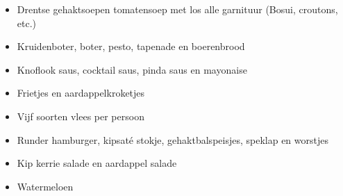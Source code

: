 \begin{itemize}
\item	Drentse gehaktsoepen tomatensoep met los alle garnituur (Bosui,  croutons, etc.)
\item	Kruidenboter, boter, pesto, tapenade en boerenbrood
\item	Knoflook saus, cocktail saus, pinda saus en mayonaise
\item	Frietjes en aardappelkroketjes
\item	Vijf soorten vlees per persoon
\item	Runder hamburger, kipsaté stokje, gehaktbalspeisjes, speklap en worstjes
\item	Kip kerrie salade en aardappel salade
\item	Watermeloen
\end{itemize}
